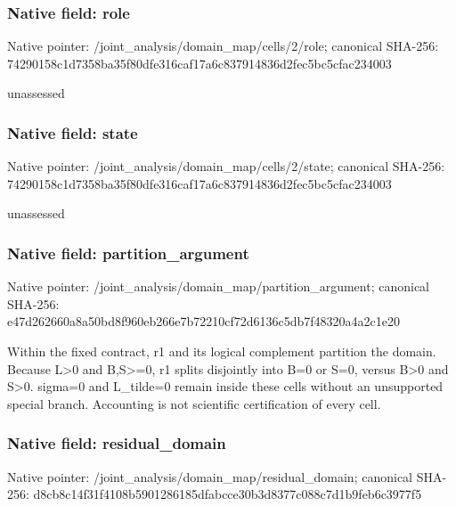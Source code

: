 \documentclass[10pt,a4paper]{article}
\begin{document}
\subsubsection{Native field: role}
Native pointer: /joint\_\allowbreak{}analysis/domain\_\allowbreak{}map/cells/2/role; canonical SHA-256: 74290158c1d7358ba35f80dfe316caf17a6c837914836d2fec5bc5cfac234003

\begingroup\raggedright\sloppy unassessed\par\endgroup

\subsubsection{Native field: state}
Native pointer: /joint\_\allowbreak{}analysis/domain\_\allowbreak{}map/cells/2/state; canonical SHA-256: 74290158c1d7358ba35f80dfe316caf17a6c837914836d2fec5bc5cfac234003

\begingroup\raggedright\sloppy unassessed\par\endgroup

\subsubsection{Native field: partition\_\allowbreak{}argument}
Native pointer: /joint\_\allowbreak{}analysis/domain\_\allowbreak{}map/partition\_\allowbreak{}argument; canonical SHA-256: e47d262660a8a50bd8f960eb266e7b72210cf72d6136c5db7f48320a4a2c1e20

\begingroup\raggedright\sloppy Within the fixed contract,\allowbreak{} r1 and its logical complement partition the domain. Because L>0 and B,\allowbreak{}S>=\allowbreak{}0,\allowbreak{} r1 splits disjointly into B=\allowbreak{}0 or S=\allowbreak{}0,\allowbreak{} versus B>0 and S>0. sigma=\allowbreak{}0 and L\_\allowbreak{}tilde=\allowbreak{}0 remain inside these cells without an unsupported special branch. Accounting is not scientific certification of every cell.\par\endgroup

\subsubsection{Native field: residual\_\allowbreak{}domain}
Native pointer: /joint\_\allowbreak{}analysis/domain\_\allowbreak{}map/residual\_\allowbreak{}domain; canonical SHA-256: d8cb8c14f31f4108b5901286185dfabcce30b3d8377c088c7d1b9feb6c3977f5
\end{document}
